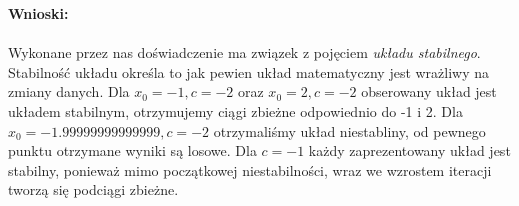 \documentclass{article}
\begin{document}
\noindent \textbf{Wnioski:}\\\\
Wykonane przez nas doświadczenie ma związek z pojęciem \textit{układu stabilnego}. Stabilność układu określa to jak pewien układ matematyczny jest wrażliwy na zmiany danych. Dla $x_{0}=-1, c = -2$ oraz 
$x_{0}=2, c = -2$ obserowany układ jest układem stabilnym, otrzymujemy ciągi zbieżne odpowiednio do -1 i 2. Dla $x_{0}=-1.99999999999999, c = -2$ otrzymaliśmy układ niestabliny, od pewnego punktu otrzymane wyniki są losowe. Dla  $c = -1$ każdy zaprezentowany układ jest stabilny, ponieważ mimo początkowej niestabilności, wraz we wzrostem iteracji tworzą się podciągi zbieżne.
\end{document}
